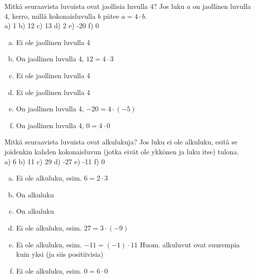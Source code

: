    \begin{tehtava}
    Mitkä seuraavista luvuista ovat jaollisia luvulla $4$? Jos luku $a$ on jaollinen luvulla $4$, kerro, millä kokonaisluvulla $b$ pätee $a = 4 \cdot b$.\\
    a) 1 \quad b) 12  \quad c) 13 \quad d) 2 \quad e) -20 \quad f) 0
    
    \begin{vastaus}
    \begin{enumerate}[a)]
    	\item Ei ole jaollinen luvulla 4
    	\item On jaollinen luvulla 4, $12 = 4 \cdot 3$
    	\item Ei ole jaollinen luvulla 4
    	\item Ei ole jaollinen luvulla 4
    	\item On jaollinen luvulla 4, $-20 = 4 \cdot (-5)$
    	\item On jaollinen luvulla 4, $0 = 4 \cdot 0$
    \end{enumerate}
    \end{vastaus}
    \end{tehtava}
    
    \begin{tehtava}
    Mitkä seuraavista luvuista ovat alkulukuja? Jos luku ei ole alkuluku, esitä se joidenkin kahden kokonaisluvun (jotka eivät ole ykkönen ja luku itse) tulona.\\
    a) 6 \quad b) 11 \quad c) 29 \quad d) -27 \quad e) -11 \quad f) 0
    
    \begin{vastaus}
    \begin{enumerate}[a)]
    	\item Ei ole alkuluku, esim. $6 = 2 \cdot 3$
    	\item On alkuluku
    	\item On alkuluku
    	\item Ei ole alkuluku, esim. $27 = 3 \cdot (-9)$
    	\item Ei ole alkuluku, esim. $-11 = (-1) \cdot 11$ Huom. alkuluvut ovat suurempia kuin yksi (ja siis positiivisia)
    	\item Ei ole alkuluku, esim. $0 = 6 \cdot 0$
    \end{enumerate}
    \end{vastaus}
    \end{tehtava}
    
